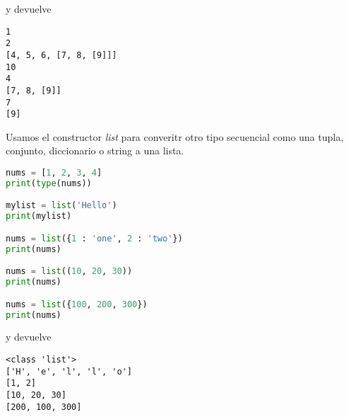     y devuelve
    \begin{lstlisting}[language={[latex]tex}]
1
2
[4, 5, 6, [7, 8, [9]]]
10
4
[7, 8, [9]]
7
[9]
    \end{lstlisting}
    Usamos el constructor \emph{list} para converitr otro tipo secuencial como una tupla, conjunto, diccionario o string a una lista.
    \begin{lstlisting}[language={python}]
nums = [1, 2, 3, 4]
print(type(nums))

mylist = list('Hello')
print(mylist)

nums = list({1 : 'one', 2 : 'two'})
print(nums)

nums = list((10, 20, 30))
print(nums)

nums = list({100, 200, 300})
print(nums)
    \end{lstlisting}
    y devuelve
    \begin{lstlisting}[language={[latex]tex}]
<class 'list'>
['H', 'e', 'l', 'l', 'o']
[1, 2]
[10, 20, 30]
[200, 100, 300]
    \end{lstlisting}
